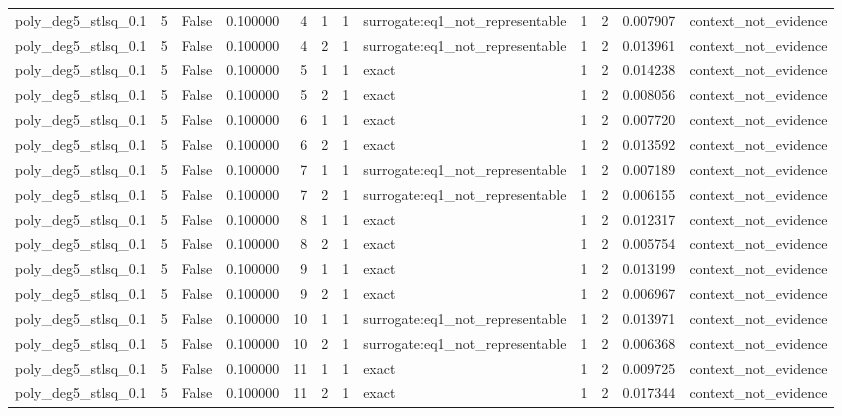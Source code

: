 \begin{tabular}{lrrrrrrlrrrl}
poly\_deg5\_stlsq\_0.1 & 5 & False & 0.100000 & 4 & 1 & 1 & surrogate:eq1\_not\_representable & 1 & 2 & 0.007907 & context\_not\_evidence \\
poly\_deg5\_stlsq\_0.1 & 5 & False & 0.100000 & 4 & 2 & 1 & surrogate:eq1\_not\_representable & 1 & 2 & 0.013961 & context\_not\_evidence \\
poly\_deg5\_stlsq\_0.1 & 5 & False & 0.100000 & 5 & 1 & 1 & exact & 1 & 2 & 0.014238 & context\_not\_evidence \\
poly\_deg5\_stlsq\_0.1 & 5 & False & 0.100000 & 5 & 2 & 1 & exact & 1 & 2 & 0.008056 & context\_not\_evidence \\
poly\_deg5\_stlsq\_0.1 & 5 & False & 0.100000 & 6 & 1 & 1 & exact & 1 & 2 & 0.007720 & context\_not\_evidence \\
poly\_deg5\_stlsq\_0.1 & 5 & False & 0.100000 & 6 & 2 & 1 & exact & 1 & 2 & 0.013592 & context\_not\_evidence \\
poly\_deg5\_stlsq\_0.1 & 5 & False & 0.100000 & 7 & 1 & 1 & surrogate:eq1\_not\_representable & 1 & 2 & 0.007189 & context\_not\_evidence \\
poly\_deg5\_stlsq\_0.1 & 5 & False & 0.100000 & 7 & 2 & 1 & surrogate:eq1\_not\_representable & 1 & 2 & 0.006155 & context\_not\_evidence \\
poly\_deg5\_stlsq\_0.1 & 5 & False & 0.100000 & 8 & 1 & 1 & exact & 1 & 2 & 0.012317 & context\_not\_evidence \\
poly\_deg5\_stlsq\_0.1 & 5 & False & 0.100000 & 8 & 2 & 1 & exact & 1 & 2 & 0.005754 & context\_not\_evidence \\
poly\_deg5\_stlsq\_0.1 & 5 & False & 0.100000 & 9 & 1 & 1 & exact & 1 & 2 & 0.013199 & context\_not\_evidence \\
poly\_deg5\_stlsq\_0.1 & 5 & False & 0.100000 & 9 & 2 & 1 & exact & 1 & 2 & 0.006967 & context\_not\_evidence \\
poly\_deg5\_stlsq\_0.1 & 5 & False & 0.100000 & 10 & 1 & 1 & surrogate:eq1\_not\_representable & 1 & 2 & 0.013971 & context\_not\_evidence \\
poly\_deg5\_stlsq\_0.1 & 5 & False & 0.100000 & 10 & 2 & 1 & surrogate:eq1\_not\_representable & 1 & 2 & 0.006368 & context\_not\_evidence \\
poly\_deg5\_stlsq\_0.1 & 5 & False & 0.100000 & 11 & 1 & 1 & exact & 1 & 2 & 0.009725 & context\_not\_evidence \\
poly\_deg5\_stlsq\_0.1 & 5 & False & 0.100000 & 11 & 2 & 1 & exact & 1 & 2 & 0.017344 & context\_not\_evidence \\

\end{tabular}
